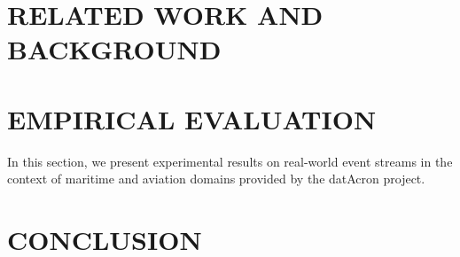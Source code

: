 



\section{RELATED WORK AND BACKGROUND}








\section{EMPIRICAL EVALUATION}
In this section, we present experimental results on real-world event streams in the context of maritime and aviation domains provided by the datAcron project.

\section{CONCLUSION}